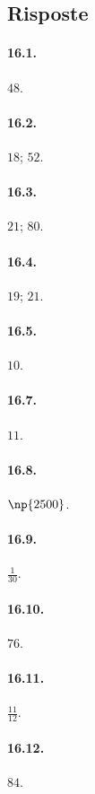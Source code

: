 \subsection{Risposte}
\begin{multicols}{2}
\paragraph{16.1.}
$48$.

\paragraph{16.2.}
$18$; $52$.

\paragraph{16.3.}
$21$; $80$.

\paragraph{16.4.}
$19$; $21$.

\paragraph{16.5.}
$10$.

\paragraph{16.7.}
$11$.

\paragraph{16.8.}
$\np{2500}$.

\paragraph{16.9.}
$\frac{1}{30}$.

\paragraph{16.10.}
$76$.

\paragraph{16.11.}
$\frac{11}{12}$.

\paragraph{16.12.}
$84$.


\end{multicols}
